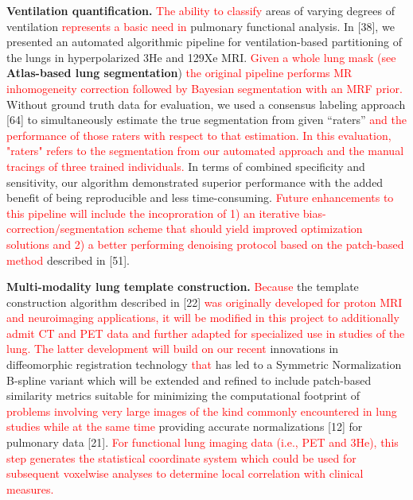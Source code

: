 \documentclass[11pt,]{article}
\begin{document}
\textbf{Ventilation quantification.}
\textcolor{red}{The ability to classify} areas of varying degrees of
ventilation \textcolor{red}{represents a basic need in} pulmonary
functional analysis. In {[}38{]}, we presented an automated algorithmic
pipeline for ventilation-based partitioning of the lungs in
hyperpolarized 3He and 129Xe MRI.
\textcolor{red}{Given a whole lung mask (see } \textbf{Atlas-based lung
segmentation})
\textcolor{red}{the original pipeline performs MR inhomogeneity correction followed by
Bayesian segmentation with an MRF prior.} Without ground truth data for
evaluation, we used a consensus labeling approach {[}64{]} to
simultaneously estimate the true segmentation from given ``raters''
\textcolor{red}{and the performance of those raters with respect to that estimation.
In this evaluation, "raters" refers to the segmentation from our automated approach
and the manual tracings of three trained individuals.} In terms of
combined specificity and sensitivity, our algorithm demonstrated
superior performance with the added benefit of being reproducible and
less time-consuming.
\textcolor{red}{Future enhancements to this pipeline will include the incoproration
of 1) an iterative bias-correction/segmentation scheme that should yield improved
optimization solutions and 2) a better performing denoising protocol based on the patch-based
method} described in {[}51{]}.

\textbf{Multi-modality lung template construction.}
\textcolor{red}{Because} the template construction algorithm described
in {[}22{]} \textcolor{red}{was
originally developed for proton MRI and neuroimaging applications, it will be
modified in this project to additionally admit CT and PET data and further
adapted for specialized use in studies of the lung.
The latter development will build on our recent} innovations in
diffeomorphic registration technology \textcolor{red}{that} has led to a
Symmetric Normalization B-spline variant which will be extended and
refined to include patch-based similarity metrics suitable for
minimizing the computational footprint of
\textcolor{red}{problems involving very large images of the kind commonly
encountered in lung studies while at the same time} providing accurate
normalizations {[}12{]} for pulmonary data {[}21{]}.
\textcolor{red}{For functional lung imaging data (i.e., PET and 3He), this
step generates the statistical coordinate system which could be used for subsequent
voxelwise analyses to determine local correlation with clinical measures.}
\end{document}
